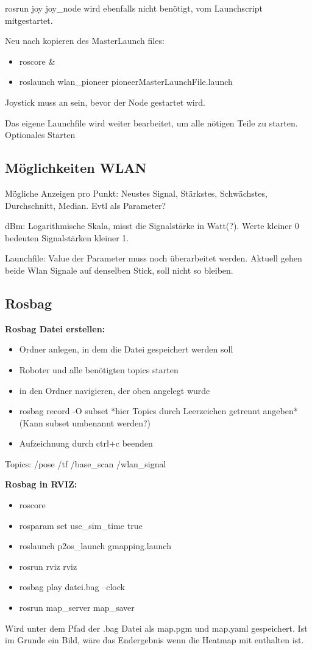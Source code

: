 \documentclass{scrartcl}%
\begin{document}
rosrun joy joy\_node wird ebenfalls nicht benötigt, vom Launchscript mitgestartet.

Neu nach kopieren des MasterLaunch files:
\begin{itemize}
	\item roscore \&
	\item roslaunch wlan\_pioneer pioneerMasterLaunchFile.launch
\end{itemize}
Joystick muss an sein, bevor der Node gestartet wird.

Das eigene Launchfile wird weiter bearbeitet, um alle nötigen Teile zu starten. Optionales Starten 

\subsection{Möglichkeiten WLAN}
Mögliche Anzeigen pro Punkt: Neustes Signal, Stärkstes, Schwächstes, Durchschnitt, Median. Evtl als Parameter?

dBm: Logarithmische Skala, misst die Signalstärke in Watt(?). Werte kleiner 0 bedeuten Signalstärken kleiner 1.

Launchfile: Value der Parameter muss noch überarbeitet werden. Aktuell gehen beide Wlan Signale auf denselben Stick, soll nicht so bleiben.

\subsection{Rosbag}
\textbf{Rosbag Datei erstellen:}
\begin{itemize}
	\item Ordner anlegen, in dem die Datei gespeichert werden soll
	\item Roboter und alle benötigten topics starten
	\item in den Ordner navigieren, der oben angelegt wurde
	\item rosbag record -O subset *hier Topics durch Leerzeichen getrennt angeben* (Kann subset umbenannt werden?)
	\item Aufzeichnung durch ctrl+c beenden
\end{itemize}
Topics: /pose /tf /base\_scan /wlan\_signal

\textbf{Rosbag in RVIZ:}
\begin{itemize}
	\item roscore
	\item rosparam set use\_sim\_time true
	\item roslaunch p2os\_launch gmapping.launch
	\item rosrun rviz rviz
	\item rosbag play datei.bag --clock
	\item rosrun map\_server map\_saver
\end{itemize}
Wird unter dem Pfad der .bag Datei als map.pgm und map.yaml gespeichert. Ist im Grunde ein Bild, wäre das Endergebnis wenn die Heatmap mit enthalten ist.
\end{document}
